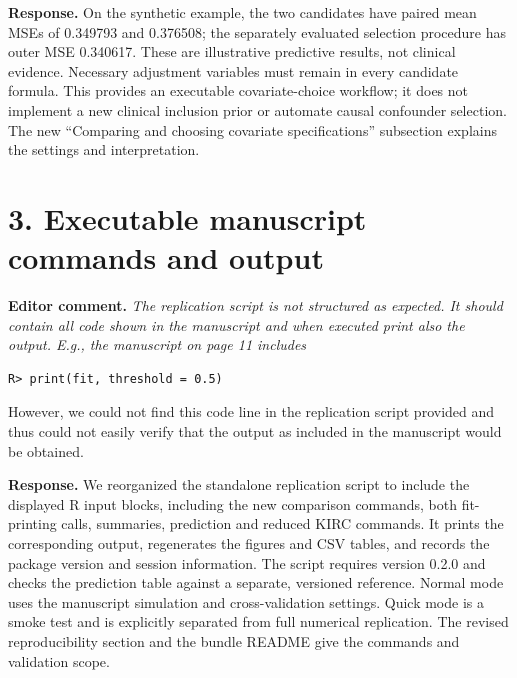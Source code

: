 \documentclass[11pt]{article}
\newenvironment{editorcomment}
  {\par\smallskip\sloppy\noindent\textbf{Editor comment.}\itshape}
  {\par\smallskip\fussy}
\newenvironment{response}
  {\noindent\textbf{Response.}}
  {\par\smallskip}
\begin{document}
\begin{response}
On the synthetic example, the two candidates have paired mean MSEs of 0.349793
and 0.376508; the separately evaluated selection procedure has outer MSE
0.340617. These are illustrative predictive results, not clinical evidence.
Necessary adjustment variables must remain in every candidate formula. This
provides an executable covariate-choice workflow; it does not implement a new
clinical inclusion prior or automate causal confounder selection. The new
``Comparing and choosing covariate specifications'' subsection explains the
settings and interpretation.
\end{response}

\section*{3. Executable manuscript commands and output}
\begin{editorcomment}
The replication script is not structured as expected. It should contain all code
shown in the manuscript and when executed print also the output. E.g., the
manuscript on page 11 includes
\begin{verbatim}
R> print(fit, threshold = 0.5)
\end{verbatim}
\noindent However, we could not find this code line in the replication script
provided and thus could not easily verify that the output as included in the
manuscript would be obtained.
\end{editorcomment}
\begin{response}
We reorganized the standalone replication script to include the displayed
R input blocks, including the new comparison commands, both fit-printing calls, summaries, prediction and
reduced KIRC commands. It prints the corresponding output, regenerates the
figures and CSV tables, and records the package version and session information.
The script requires version 0.2.0 and checks the prediction table against a
separate, versioned reference. Normal mode uses the manuscript simulation and
cross-validation settings. Quick mode is a smoke test and is explicitly
separated from full numerical replication. The revised reproducibility section
and the bundle README give the commands and validation scope.
\end{response}
\end{document}
